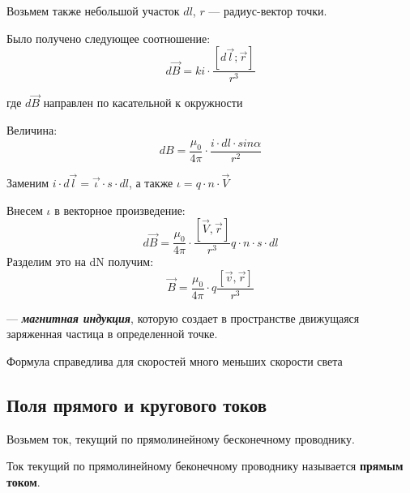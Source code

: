 \documentclass[../main.tex]{subfiles}
\begin{document}
Возьмем также небольшой участок $dl$, $r$ --- радиус-вектор точки.

Было получено следующее соотношение:
\[d\vec B = ki \cdot \frac{[d\vec l; \vec r]}{r^3}\]
\begin{center}
    где $d\vec B$ направлен по касательной к окружности
\end{center}
Величина:
\[dB = \frac{\mu_0}{4 \pi} \cdot \frac{i \cdot dl \cdot sin{\alpha}}{r^2}\]

Заменим $i \cdot d \vec l = \vec \iota \cdot s \cdot dl$,  а также $\iota = q \cdot n \cdot \vec V$

Внесем $\iota$ в векторное произведение:
\[d \vec B = \frac{\mu_0}{4\pi} \cdot \frac{[\vec V, \vec r]}{r^3} q \cdot n \cdot s \cdot dl\]
Разделим это на dN получим:
\[ \vec B = \frac{\mu_0}{4 \pi} \cdot q\frac{[\vec v, \vec r]}{r^3}\]
\begin{center}
    --- \textbf{\textit{магнитная индукция}}, которую создает в пространстве движущаяся заряженная частица в определенной точке.

    Формула справедлива для скоростей много меньших скорости света
\end{center}

\subsection{Поля прямого и кругового токов}
Возьмем ток, текущий по прямолинейному бесконечному проводнику.

\vspace{5px}

 Ток текущий по прямолинейному беконечному проводнику называется \textbf{прямым током}.
\end{document}

